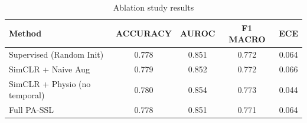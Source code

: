 \begin{table}[ht]
\centering
\caption{Ablation study results}
\label{tab:ablation}
\begin{tabular}{lcccc}
\toprule
Method & ACCURACY & AUROC & F1 MACRO & ECE \\
\midrule
Supervised (Random Init) & 0.778 & 0.851 & 0.772 & 0.064 \\
SimCLR + Naive Aug & 0.779 & 0.852 & 0.772 & 0.066 \\
SimCLR + Physio (no temporal) & 0.780 & 0.854 & 0.773 & 0.044 \\
Full PA-SSL & 0.778 & 0.851 & 0.771 & 0.064 \\
\bottomrule
\end{tabular}
\end{table}